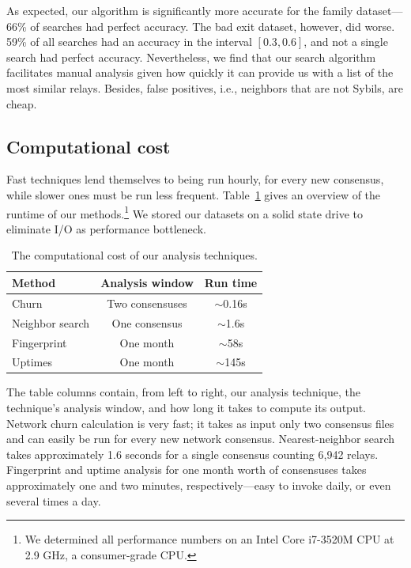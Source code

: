 As expected, our algorithm is significantly more accurate for the family
dataset---66\% of searches had perfect accuracy.  The bad exit dataset, however,
did worse.  59\% of all searches had an accuracy in the interval $[0.3,0.6]$,
and not a single search had perfect accuracy.  Nevertheless, we find that our
search algorithm facilitates manual analysis given how quickly it can provide us
with a list of the most similar relays.  Besides, false positives, i.e.,
neighbors that are not Sybils, are cheap.

\subsection{Computational cost}
\label{sec:performance}
Fast techniques lend themselves to being run hourly, for every new consensus,
while slower ones must be run less frequent.  Table~\ref{tab:exp-deployment}
gives an overview of the runtime of our methods.\footnote{We determined all
performance numbers on an Intel Core i7-3520M CPU at 2.9 GHz, a consumer-grade
CPU.}  We stored our datasets on a solid state drive to eliminate I/O as
performance bottleneck.

\begin{table}[t]
	\small
	\centering
	\begin{tabular}{lcc}
	\hline
	\textbf{Method} & \textbf{Analysis window} & \textbf{Run time} \\
	\hline
	Churn & Two consensuses & $\sim$0.16s \\
	Neighbor search & One consensus & $\sim$1.6s \\
	Fingerprint & One month & $\sim$58s \\
	Uptimes & One month & $\sim$145s \\
	\hline
	\end{tabular}
	\caption{The computational cost of our analysis techniques.}
	\label{tab:exp-deployment}
\end{table}

The table columns contain, from left to right, our analysis technique, the
technique's analysis window, and how long it takes to compute its output.
Network churn calculation is very fast; it takes as input only two consensus
files and can easily be run for every new network consensus.  Nearest-neighbor
search takes approximately 1.6 seconds for a single consensus counting 6,942
relays.  Fingerprint and uptime analysis for one month worth of consensuses
takes approximately one and two minutes, respectively---easy to invoke daily, or
even several times a day.
